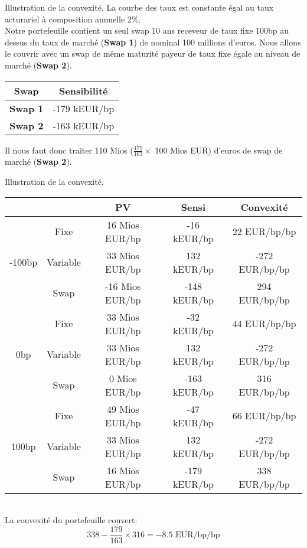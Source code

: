 \documentclass{beamer}
\begin{document}
\begin{frame}{Illustration de la convexité.}
La courbe des taux est constante égal au taux acturariel à composition annuelle 2\%.\\
\vspace{0.5cm}
Notre portefeuille contient un seul swap 10 ans receveur de taux fixe 100bp au dessus du taux de marché (\textbf{Swap 1}) de nominal 100 millions d'euros. Nous allons le couvrir avec un swap de même maturité payeur de taux fixe égale au niveau de marché (\textbf{Swap 2}).\\
\begin{center}
\begin{tabular}{|c|c|}
\hline
Swap&Sensibilité \\ 
\hline
\textbf{Swap 1} &-179 kEUR/bp \\ 
\textbf{Swap 2} &-163 kEUR/bp \\ 
\hline
\end{tabular}
\end{center}
Il nous faut donc traiter 110 Mios ($\frac{179}{163} \times$ 100 Mios EUR)  d'euros de swap de marché (\textbf{Swap 2}).
\end{frame}

\begin{frame}{Illustration de la convexité.}
\small
\begin{tabular}{|c|c|c|c|c|}
\hline
&&PV&Sensi&Convexité  \\ 
\hline
\multirow{3}{*}{-100bp}&Fixe& 16 Mios EUR/bp &  -16 kEUR/bp & 22 EUR/bp/bp \\ 
&Variable& 33 Mios EUR/bp & 132 kEUR/bp & -272 EUR/bp/bp \\ 
&Swap& -16 Mios EUR/bp & -148 kEUR/bp & 294 EUR/bp/bp \\ 
\hline
\multirow{3}{*}{0bp}&Fixe& 33 Mios EUR/bp &  -32 kEUR/bp & 44 EUR/bp/bp \\ 
&Variable& 33 Mios EUR/bp & 132 kEUR/bp & -272 EUR/bp/bp \\ 
&Swap& 0 Mios EUR/bp & -163 kEUR/bp & 316 EUR/bp/bp \\ 
\hline
\multirow{3}{*}{100bp}&Fixe& 49 Mios EUR/bp &  -47 kEUR/bp & 66 EUR/bp/bp \\ 
&Variable& 33 Mios EUR/bp & 132 kEUR/bp & -272 EUR/bp/bp \\ 
&Swap& 16 Mios EUR/bp & -179 kEUR/bp & 338 EUR/bp/bp \\ 
\hline
\end{tabular}\\
\normalsize
\vspace{0.5cm}
La convexité du portefeuille couvert:
\[
338 - \frac{179}{163} \times 316 = -8.5\text{ EUR/bp/bp}
\]
\end{frame}
\end{document}
